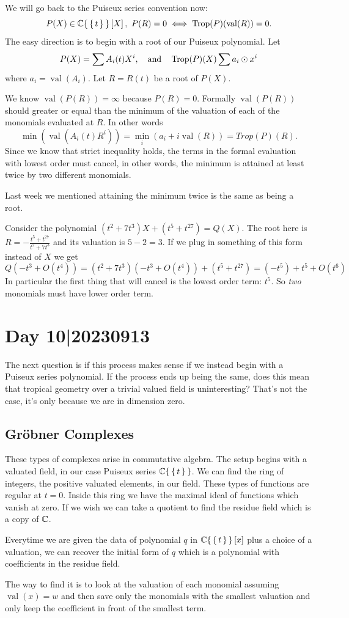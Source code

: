 \documentclass[12pt]{memoir}
\DeclareMathOperator{\val}{val}
\DeclareMathOperator{\Trop}{Trop}
\theoremstyle{definition}
\begin{document}
    We will go back to the Puiseux series convention now:
    $$P(X)\in\bC\set{\set{t}}\bonj{X},\ P(R)=0\iff \Trop(P)(\val(R))=0.$$
    The easy direction is to begin with a root of our Puiseux polynomial. Let 
    $$P(X)=\sum A_i(t)X^i,\word{and}\Trop(P)(X)\sum a_i\odot x^i$$
    where $a_i=\val(A_i)$. Let $R=R(t)$ be a root of $P(X)$.\par 
    We know $\val(P(R))=\infty$ because $P(R)=0$. Formally $\val(P(R))$ should greater or equal than the minimum of the valuation of each of the monomials evaluated at $R$. In other words 
    $$\min(\val(A_i(t)R^i))=\min_i(a_i+i\val(R))=Trop(P)(R).$$
    Since we know that strict inequality holds, the terms in the formal evaluation with lowest order must cancel, in other words, the minimum is attained at least twice by two different monomials.\par 
    Last week we mentioned attaining the minimum twice is the same as being a root.

    \begin{Ex}
        Consider the polynomial $(t^2+7t^3)X+(t^5+t^{27})=Q(X)$. The root here is $R=-\frac{t^5+t^{27}}{t^2+7t^3}$ and its valuation is $5-2=3$. If we plug in something of this form instead of $X$ we get 
        $$Q(-t^3+O(t^4))=(t^2+7t^3)(-t^3+O(t^4))+(t^5+t^{27})=(-t^5)+t^5+O(t^6)$$
        In particular the first thing that will cancel is the lowest order term: $t^5$. So \emph{two} monomials must have lower order term.
    \end{Ex}

\section{Day 10|20230913}

The next question is if this process makes sense if we instead begin with a Puiseux series polynomial. If the process ends up being the same, does this mean that tropical geometry over a trivial valued field is uninteresting? That's not the case, it's only because we are in dimension zero. 

\subsection{Gr\"obner Complexes}

These types of complexes arise in commutative algebra. The setup begins with a valuated field, in our case Puiseux series $\mathbb{C}\{\,\{\,t\,\}\,\}$. We can find the ring of integers, the positive valuated elements, in our field. These types of functions are regular at $t=0$. Inside this ring we have the maximal ideal of functions which vanish at zero. If we wish we can take a quotient to find the residue field which is a copy of $\mathbb{C}$.\par 
Everytime we are given the data of polynomial $q$ in $\mathbb{C}\{\,\{\,t\,\}\,\}\left\lbrack x\right\rbrack$ plus a choice of a valuation, we can recover the initial form of $q$ which is a polynomial with coefficients in the residue field.\par 
The way to find it is to look at the valuation of each monomial assuming $\val(x)=w$ and then save only the monomials with the smallest valuation and only keep the coefficient in front of the smallest term.
\end{document}
